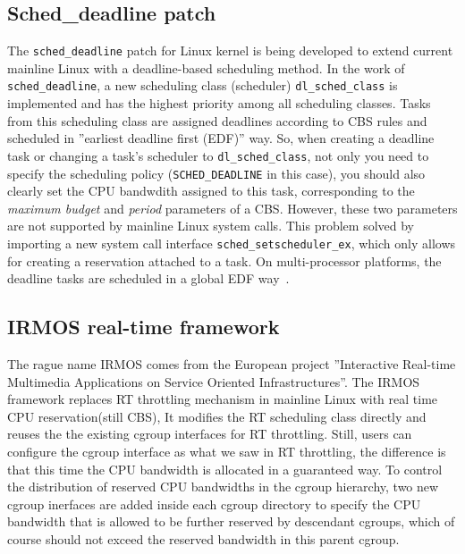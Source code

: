 \subsection{Sched\_deadline patch\label{sec:RelatedWork_dl}}
The \texttt{sched\_deadline} patch for Linux kernel is being developed 
to extend current mainline Linux with a deadline-based scheduling method. 
In the work of \texttt{sched\_deadline}, a new scheduling class (scheduler) 
\texttt{dl\_sched\_class} is implemented and has the highest priority among 
all scheduling classes. Tasks from this scheduling class are assigned 
deadlines according to CBS rules and scheduled in ''earliest deadline first
(EDF)'' way. So, when creating a deadline task or changing a task's scheduler
to \texttt{dl\_sched\_class}, not only you need to specify the scheduling
policy (\texttt{SCHED\_DEADLINE} in this case), you should also clearly
set the CPU bandwdith assigned to this task, corresponding to the
\emph{maximum budget} and \emph{period} parameters of a CBS. However,
these two parameters are not supported by mainline Linux system calls.
This problem solved by importing a new system call interface 
\texttt{sched\_setscheduler\_ex}, which only allows for creating a 
reservation attached to a task. On multi-processor platforms, the 
deadline tasks are scheduled in a global EDF way~\cite{J.Lelli}.

\subsection{IRMOS real-time framework\label{sec:RelatedWork_irmos}}
The rague name IRMOS comes from the European project ''Interactive 
Real-time Multimedia Applications on Service Oriented Infrastructures''. 
The IRMOS framework replaces RT throttling mechanism in mainline Linux 
with real time CPU reservation(still CBS), It modifies the RT scheduling 
class directly and reuses the the existing cgroup interfaces for RT 
throttling. Still, users can configure the cgroup interface as what we saw 
in RT throttling, the difference is that this time 
the CPU bandwidth is allocated in a guaranteed way. To control the distribution 
of reserved CPU bandwidths in the cgroup hierarchy, two new cgroup inerfaces
are added inside each cgroup directory to specify the CPU bandwidth that 
is allowed to be further reserved by descendant cgroups, which of course 
should not exceed the reserved bandwidth in this parent cgroup.

